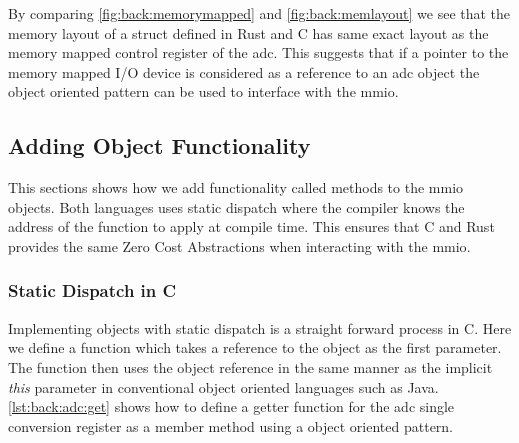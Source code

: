 By comparing \autoref{fig:back:memorymapped} and \autoref{fig:back:memlayout} we see that the memory layout of a struct defined in Rust and C has same exact layout as the memory mapped control register of the \gls{adc}.
This suggests that if a pointer to the memory mapped I/O device is considered as a reference to an \gls{adc} object the object oriented pattern can be used to interface with the \gls{mmio}.

\subsection{Adding Object Functionality}

This sections shows how we add functionality called methods to the \gls{mmio} objects.
Both languages uses static dispatch where the compiler knows the address of the function to apply at compile time.
This ensures that C and Rust provides the same Zero Cost Abstractions when interacting with the \gls{mmio}.

\subsubsection{Static Dispatch in C}

Implementing objects with static dispatch is a straight forward process in C.
Here we define a function which takes a reference to the object as the first parameter.
The function then uses the object reference in the same manner as the implicit \emph{this} parameter in conventional object oriented languages such as Java.
\autoref{lst:back:adc:get} shows how to define a getter function for the \gls{adc} single conversion register as a member method using a object oriented pattern.

